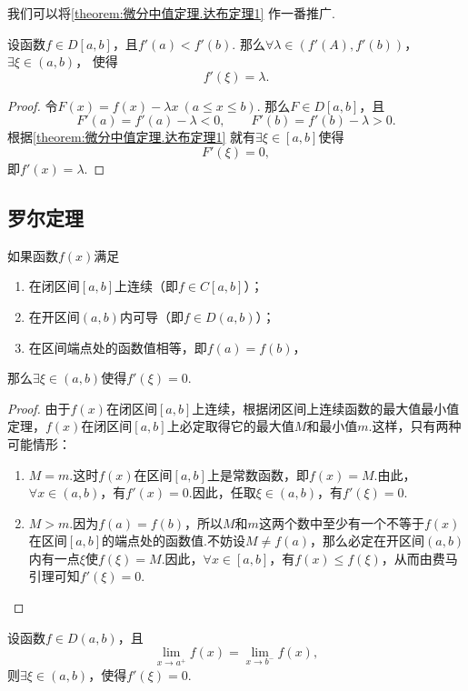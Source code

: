 我们可以将\cref{theorem:微分中值定理.达布定理1} 作一番推广.
\begin{theorem}[达布介值定理]\label{theorem:微分中值定理.达布定理2}
设函数\(f \in D[a,b]\)，且\(f'(a) < f'(b)\).
那么\(\forall\lambda\in(f'(A),f'(b))\)，\(\exists\xi\in(a,b)\)，
使得\[
f'(\xi) = \lambda.
\]
\begin{proof}
令\(F(x) = f(x) - \lambda x\ (a \leq x \leq b)\).
那么\(F \in D[a,b]\)，且\[
F'(a) = f'(a) - \lambda < 0, \qquad
F'(b) = f'(b) - \lambda > 0.
\]
根据\cref{theorem:微分中值定理.达布定理1} 就有\(\exists\xi\in[a,b]\)使得\[
F'(\xi)=0,
\]即\(f'(x) = \lambda\).
\end{proof}
\end{theorem}

\subsection{罗尔定理}
\begin{theorem}[罗尔定理]\label{theorem:微分中值定理.罗尔定理}
如果函数\(f(x)\)满足
\begin{enumerate}
\item 在闭区间\([a,b]\)上连续（即\(f \in C[a,b]\)）；
\item 在开区间\((a,b)\)内可导（即\(f \in D(a,b)\)）；
\item 在区间端点处的函数值相等，即\(f(a)=f(b)\)，
\end{enumerate}
那么\(\exists \xi \in (a,b)\)使得\(f'(\xi) = 0\).
\begin{proof}
由于\(f(x)\)在闭区间\([a,b]\)上连续，根据闭区间上连续函数的最大值最小值定理，\(f(x)\)在闭区间\([a,b]\)上必定取得它的最大值\(M\)和最小值\(m\).这样，只有两种可能情形：\begin{enumerate}
\item \(M=m\).这时\(f(x)\)在区间\([a,b]\)上是常数函数，即\(f(x)=M\).由此，\(\forall x\in(a,b)\)，有\(f'(x)=0\).因此，任取\(\xi\in(a,b)\)，有\(f'(\xi)=0\).
\item \(M>m\).因为\(f(a)=f(b)\)，所以\(M\)和\(m\)这两个数中至少有一个不等于\(f(x)\)在区间\([a,b]\)的端点处的函数值.不妨设\(M \neq f(a)\)，那么必定在开区间\((a,b)\)内有一点\(\xi\)使\(f(\xi)=M\).因此，\(\forall x\in[a,b]\)，有\(f(x) \leq f(\xi)\)，从而由费马引理可知\(f'(\xi)=0\).
\qedhere
\end{enumerate}
\end{proof}
\end{theorem}

\begin{corollary}
设函数\(f \in D(a,b)\)，且\[
\lim\limits_{x \to a^+} f(x)
= \lim\limits_{x \to b^-} f(x),
\]则\(\exists\xi\in(a,b)\)，使得\(f'(\xi) = 0\).
\end{corollary}

